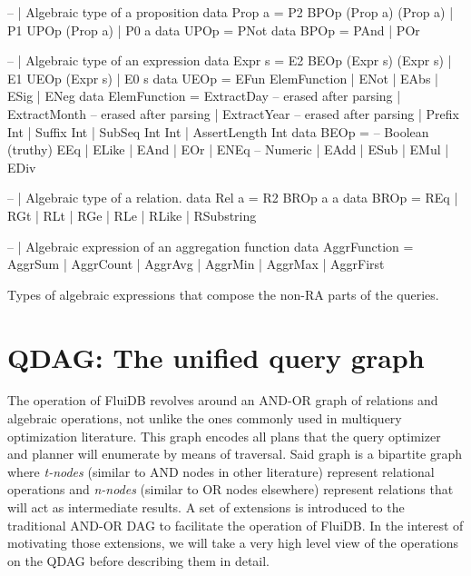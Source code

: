 \begin{code}
  \begin{haskellcode}
    -- | Algebraic type of a proposition
    data Prop a = P2 BPOp (Prop a) (Prop a)
      | P1 UPOp (Prop a)
      | P0 a
    data UPOp = PNot
    data BPOp = PAnd | POr

    -- | Algebraic type of an expression
    data Expr s = E2 BEOp (Expr s) (Expr s)
      | E1 UEOp (Expr s)
      | E0 s
    data UEOp =
      EFun ElemFunction
      | ENot
      | EAbs
      | ESig
      | ENeg
    data ElemFunction
      = ExtractDay -- erased after parsing
      | ExtractMonth -- erased after parsing
      | ExtractYear -- erased after parsing
      | Prefix Int
      | Suffix Int
      | SubSeq Int Int
      | AssertLength Int
    data BEOp =
      -- Boolean (truthy)
      EEq | ELike | EAnd | EOr | ENEq
      -- Numeric
      | EAdd | ESub | EMul | EDiv

    -- | Algebraic type of a relation.
    data Rel a = R2 BROp a a
    data BROp
      = REq
      | RGt
      | RLt
      | RGe
      | RLe
      | RLike
      | RSubstring

    -- | Algebraic expression of an aggregation function
    data AggrFunction = AggrSum
      | AggrCount
      | AggrAvg
      | AggrMin
      | AggrMax
      | AggrFirst
  \end{haskellcode}
  \caption{\label{lst:expr_types} Types of algebraic expressions that compose the non-RA parts of the queries.}
\end{code}
\section{QDAG: The unified query graph}
\label{sec:qdag}

The operation of FluiDB revolves around an AND-OR graph of relations
and algebraic operations, not unlike the ones commonly used in
multiquery optimization literature. This graph encodes all plans that
the query optimizer and planner will enumerate by means of
traversal. Said graph is a bipartite graph where \emph{t-nodes}
(similar to AND nodes in other literature) represent relational
operations and \emph{n-nodes} (similar to OR nodes elsewhere)
represent relations that will act as intermediate results.  A set of
extensions is introduced to the traditional AND-OR DAG to facilitate
the operation of FluiDB. In the interest of motivating those
extensions, we will take a very high level view of the operations on
the QDAG before describing them in detail.

